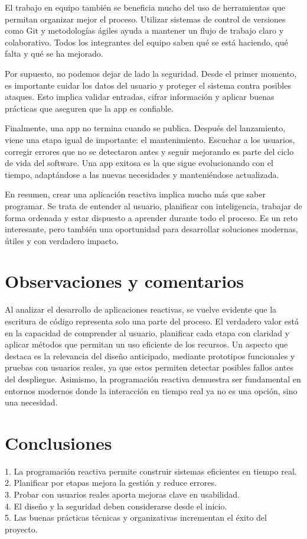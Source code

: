 \documentclass[12pt,letterpaper]{article}
\begin{document}
El trabajo en equipo también se beneficia mucho del uso de herramientas que permitan organizar mejor el proceso. Utilizar sistemas de control de versiones como Git y metodologías ágiles ayuda a mantener un flujo de trabajo claro y colaborativo. Todos los integrantes del equipo saben qué se está haciendo, qué falta y qué se ha mejorado.

Por supuesto, no podemos dejar de lado la seguridad. Desde el primer momento, es importante cuidar los datos del usuario y proteger el sistema contra posibles ataques. Esto implica validar entradas, cifrar información y aplicar buenas prácticas que aseguren que la app es confiable.

Finalmente, una app no termina cuando se publica. Después del lanzamiento, viene una etapa igual de importante: el mantenimiento. Escuchar a los usuarios, corregir errores que no se detectaron antes y seguir mejorando es parte del ciclo de vida del software. Una app exitosa es la que sigue evolucionando con el tiempo, adaptándose a las nuevas necesidades y manteniéndose actualizada.

En resumen, crear una aplicación reactiva implica mucho más que saber programar. Se trata de entender al usuario, planificar con inteligencia, trabajar de forma ordenada y estar dispuesto a aprender durante todo el proceso. Es un reto interesante, pero también una oportunidad para desarrollar soluciones modernas, útiles y con verdadero impacto.
\section*{Observaciones y comentarios}
Al analizar el desarrollo de aplicaciones reactivas, se vuelve evidente que la escritura de código representa solo una parte del proceso. El verdadero valor está en la capacidad de comprender al usuario, planificar cada etapa con claridad y aplicar métodos que permitan un uso eficiente de los recursos. Un aspecto que destaca es la relevancia del diseño anticipado, mediante prototipos funcionales y pruebas con usuarios reales, ya que estos permiten detectar posibles fallos antes del despliegue. Asimismo, la programación reactiva demuestra ser fundamental en entornos modernos donde la interacción en tiempo real ya no es una opción, sino una necesidad.

\section*{Conclusiones}
1. La programación reactiva permite construir sistemas eficientes en tiempo real.\\
2. Planificar por etapas mejora la gestión y reduce errores.\\
3. Probar con usuarios reales aporta mejoras clave en usabilidad.\\
4. El diseño y la seguridad deben considerarse desde el inicio.\\
5. Las buenas prácticas técnicas y organizativas incrementan el éxito del proyecto.
\end{document}
